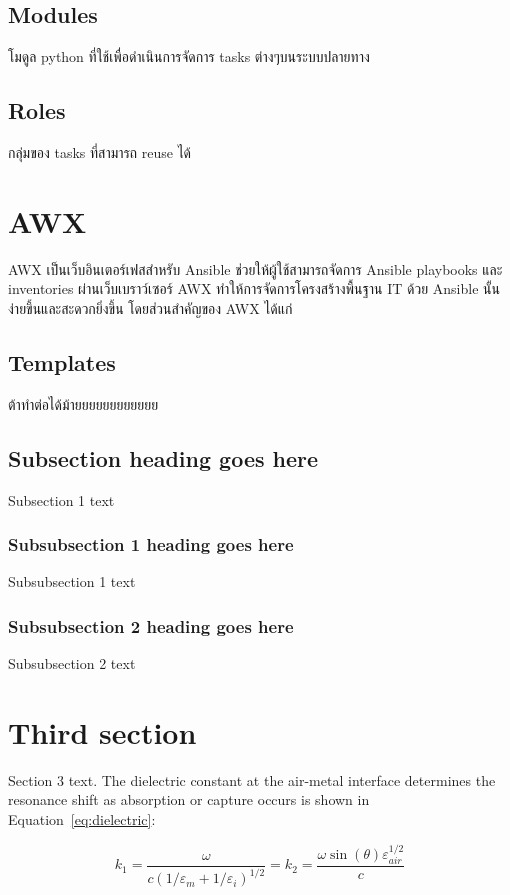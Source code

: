 \subsection{Modules}
โมดูล python ที่ใช้เพื่อดำเนินการจัดการ tasks ต่างๆบนระบบปลายทาง
\subsection{Roles}
กลุ่มของ tasks ที่สามารถ reuse ได้

\section{AWX}
AWX เป็นเว็บอินเตอร์เฟสสำหรับ Ansible ช่วยให้ผู้ใช้สามารถจัดการ Ansible playbooks และ inventories ผ่านเว็บเบราว์เซอร์ AWX ทำให้การจัดการโครงสร้างพื้นฐาน IT ด้วย Ansible นั้นง่ายขึ้นและสะดวกยิ่งขึ้น โดยส่วนสำคัญของ AWX ได้แก่
\subsection{Templates}
ต้าทำต่อได้ม้ายยยยยยยยยยยย

\subsection{Subsection heading goes here}

Subsection 1 text

\subsubsection{Subsubsection 1 heading goes here}
Subsubsection 1 text

\subsubsection{Subsubsection 2 heading goes here}
Subsubsection 2 text

\section{Third section}
Section 3 text. The dielectric constant
at the air-metal interface determines
the resonance shift as absorption or capture occurs
is shown in Equation~\eqref{eq:dielectric}:

\begin{equation}\label{eq:dielectric}
k_1=\frac{\omega}{c({1/\varepsilon_m + 1/\varepsilon_i})^{1/2}}=k_2=\frac{\omega
\sin(\theta)\varepsilon_\mathit{air}^{1/2}}{c}
\end{equation}


